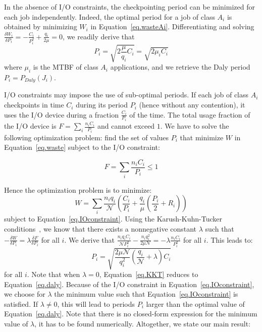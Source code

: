 \documentclass[conference,nofonttune]{IEEEtran}
\newcommand{\nbnodesplat}{{\mathcal N}}
\newcommand{\app}[1]{A_{#1}}
\newcommand{\nbapp}[1]{n_{#1}}
\newcommand{\nbnodes}[1]{q_{#1}}
\newcommand{\period}[1]{P_{#1}}
\newcommand{\ckpt}[1]{C_{#1}}
\newcommand{\reco}[1]{R_{#1}}
\newcommand{\wasteapp}[1]{W_{#1}}
\newcommand{\mtbfplat}{\mu}
\newcommand{\wasteplat}{W}
\newcommand{\ioconstraint}{F}
\begin{document}
In the absence of I/O constraints, the checkpointing period can be minimized
for each job independently. Indeed, the optimal period for a job
of class $\app{i}$ is obtained by minimizing $\wasteapp{i}$ in
Equation~\eqref{eq.wasteAi}.
Differentiating and solving
$\frac{\delta \wasteapp{i}}{\delta \period{i}} = - \frac{\ckpt{i}}{\period{i}^{2}} + \frac{\nbnodes{i}}{2 \mtbfplat} = 0$,
we readily derive that
\begin{equation}
\period{i} = \sqrt{2 \frac{\mtbfplat}{\nbnodes{i}} \ckpt{i}} = \sqrt{2 \mu_{i} \ckpt{i}}
\label{eq.daly}
\end{equation}
where $\mu_{i}$ is the MTBF of  class $\app{i}$ applications, and we retrieve the Daly period
$\period{i} = \period{Daly}(J_{i})$.

I/O constraints may impose the use of sub-optimal periods. If each job
of class $\app{i}$ checkpoints in time $\ckpt{i}$ during its period $\period{i}$ (hence
without any contention), it uses the I/O device during a fraction $\frac{\ckpt{i}}{\period{i}}$ of the time.
The total usage fraction of the  I/O device is $\ioconstraint = \sum_{i} \frac{\nbapp{i} \ckpt{i}}{\period{i}}$
and cannot exceed $1$. We have to solve the following optimization problem: find
the set of values $\period{i}$ that minimize $\wasteplat$ in Equation~\eqref{eq.waste} subject to the I/O constraint:

\begin{equation}
\ioconstraint = \sum_{i} \frac{\nbapp{i} \ckpt{i}}{\period{i}} \leq 1
\label{eq.IOconstraint}
\end{equation}

Hence the optimization problem is to minimize:
\begin{equation}
\wasteplat = \sum_i \frac{\nbapp{i} \nbnodes{i}}{\nbnodesplat}  \left( \frac{\ckpt{i}}{\period{i}} +
\frac{\nbnodes{i}}{\mtbfplat}(\frac{\period{i}}{2} + \reco{i}) \right)
\label{eq.totalwaste}
\end{equation}
subject to Equation~\eqref{eq.IOconstraint}.
Using the Karush-Kuhn-Tucker conditions~\cite{Boyd2004}, we know that there exists a nonnegative constant
$\lambda$
such that
$- \frac{\delta \wasteplat}{\delta \period{i}} = \lambda \frac{\delta \ioconstraint}{\delta \period{i}}$
for all $i$. We derive that
$\frac{\nbapp{i} \nbnodes{i} \ckpt{i}}{\nbnodesplat \period{i}^{2}} -    \frac{\nbapp{i} \nbnodes{i}^{2}}{2 \mtbfplat \nbnodesplat} = - \lambda \frac{\nbapp{i} \ckpt{i}}{\period{i}^{2}}
$
for all $i$. This leads to:
 \begin{equation}
\period{i} = \sqrt{\frac{2 \mtbfplat  \nbnodesplat}{\nbnodes{i}^{2}} \left(\frac{\nbnodes{i}}{\nbnodesplat} +\lambda \right) \ckpt{i}}
  \label{eq.KKT}
\end{equation}
for all $i$. Note that when $\lambda=0$, Equation~\eqref{eq.KKT} reduces to Equation~\eqref{eq.daly}.
Because of the I/O constraint in Equation~\eqref{eq.IOconstraint}, we choose
for $\lambda$ the minimum value such that Equation~\eqref{eq.IOconstraint} is
satisfied. If $\lambda \neq 0$, this will lead to periods $P_{i}$ larger than
the optimal value of Equation~\eqref{eq.daly}. Note that there is no
closed-form expression for the minimum value of $\lambda$, it has to be found
numerically.
Altogether, we state our main result:
\end{document}

